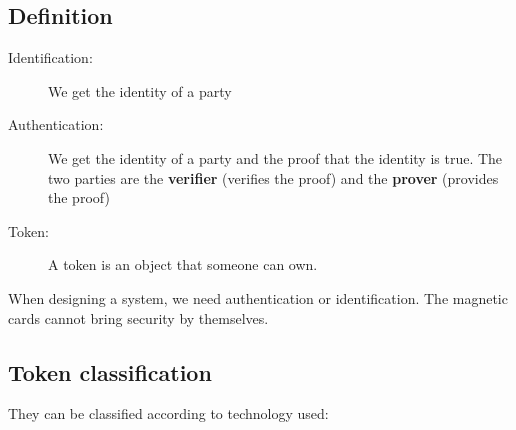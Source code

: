 
\subsection{Definition}

\begin{description}
    \item[Identification:] We get the identity of a party
    \item[Authentication:] We get the identity of a party and the proof that the
        identity is true. The two parties are the \textbf{verifier}
        (verifies the proof) and the \textbf{prover} (provides the proof)
    \item[Token:] A token is an object that someone can own. 
\end{description}

When designing a system, we need authentication or identification.
The magnetic cards cannot bring security by themselves.

\subsection{Token classification}
They can be classified according to technology used:

